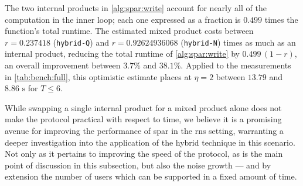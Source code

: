 The two internal products in \cref{alg:spar:write} account for nearly all of the computation in the inner loop; each one expressed as a fraction is $0.499$ times the function's total runtime. %
The estimated mixed product costs between $r = \num{0.237418}$ (\texttt{hybrid-Q}) and $r = \num{0.92624936068}$ (\texttt{hybrid-N}) times as much as an internal product, reducing the total runtime of \cref{alg:spar:write} by $0.499\,(1 - r)$, an overall improvement between $3.7\%$ and $38.1\%$. Applied to the measurements in \cref{tab:bench:full}, this optimistic estimate places \serverWrite{} at $\eta = 2$ between $13.79$ and $8.86\text{ s}$ for $T\leq 6$.

While swapping a single internal product for a mixed product alone does not make the protocol practical with respect to time, we believe it is a promising avenue for improving the performance of \gls{spar} in the \gls{rns} setting, warranting a deeper investigation into the application of the hybrid technique in this scenario. Not only as it pertains to improving the speed of the protocol, as is the main point of discussion in this subsection, but also the noise growth --- and by extension the number of users which can be supported in a fixed amount of time.